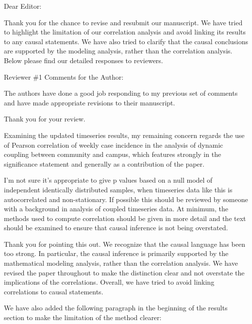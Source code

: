 \documentclass[12pt]{article}
\newcommand{\revtext}{\textsf}
\begin{document}
\noindent Dear Editor:

Thank you for the chance to revise and resubmit our manuscript.
We have tried to highlight the limitation of our correlation analysis and avoid linking its results to any causal statements.
We have also tried to clarify that the causal conclusions are supported by the modeling analysis, rather than the correlation analysis.
Below please find our detailed responses to reviewers.

\revtext{Reviewer \#1 Comments for the Author:}

\revtext{The authors have done a good job responding to my previous set of comments and have made appropriate revisions to their manuscript.}

Thank you for your review.

\revtext{Examining the updated timeseries results, my remaining concern regards the use of Pearson correlation of weekly case incidence in the analysis of dynamic coupling between community and campus, which features strongly in the significance statement and generally as a contribution of the paper.}

\revtext{I'm not sure it's appropriate to give p values based on a null model of independent identically distributed samples, when timeseries data like this is autocorrelated and non-stationary. If possible this should be reviewed by someone with a background in analysis of coupled timeseries data. At minimum, the methods used to compute correlation should be given in more detail and the text should be examined to ensure that causal inference is not being overstated.}

Thank you for pointing this out.
We recognize that the causal language has been too strong.
In particular, the causal inference is primarily supported by the mathematical modeling analysis, rather than the correlation analysis.
We have revised the paper throughout to make the distinction clear and not overstate the implications of the correlations.
Overall, we have tried to avoid linking correlations to causal statements.

We have also added the following paragraph in the beginning of the results section to make the limitation of the method clearer:
\end{document}
